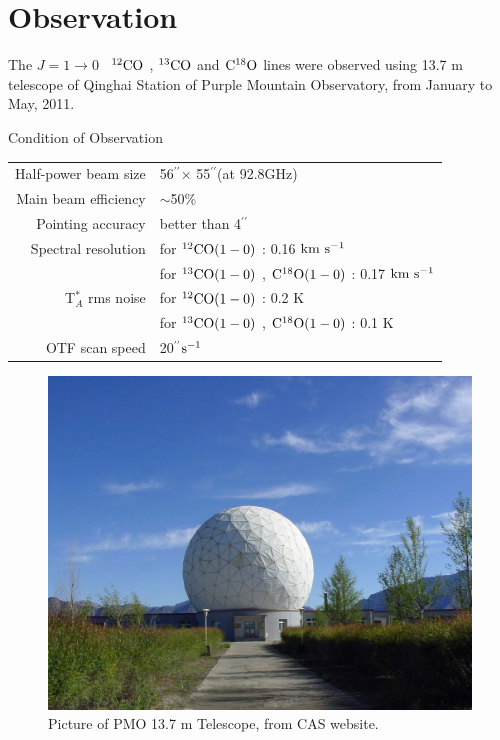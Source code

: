\documentclass{article}
\newcommand{\coa}{$\rm ^{12}CO$ }
\newcommand{\cob}{$\rm ^{13}CO$ }
\newcommand{\coc}{$\rm C^{18}O$ }
\newcommand{\coaa}{$\rm^{12}CO(1-0)$ }
\newcommand{\cobb}{$\rm^{13}CO(1-0)$ }
\newcommand{\cocc}{$\rm C^{18}O(1-0)$ }
\newcommand{\kms}{$\rm km\ s^{-1}$}
\newcommand{\arcsec}{$^{\prime\prime}$}
\begin{document}
\newpage
\section{Observation}

     The $J=1 \rightarrow 0 $ \  \coa, \cob and \coc lines were observed using 13.7 m telescope of Qinghai Station of Purple Mountain Observatory, from January to May, 2011.

        \begin{table}[H]
        \centering
         Condition of Observation\\
         \small
        \setlength{\tabcolsep}{0.1in}
        \begin{tabular}{rl}
        \\
        Half-power beam size & 56\arcsec$\times$ 55\arcsec (at 92.8GHz) \\
        Main beam efficiency & $\sim$50\%                               \\
        Pointing accuracy    & better than 4\arcsec                     \\
        Spectral resolution  & for \coaa: 0.16 \kms                     \\
                             & for \cobb, \cocc:  0.17 \kms           \\
        T$^*_A$ rms noise    & for \coaa: 0.2 K                         \\
                             & for \cobb, \cocc: 0.1 K               \\
        OTF scan speed       & 20\arcsec $\rm s^{-1}$


        \end{tabular}
        \end{table}

\newpage

    \begin{figure}[H]
              \centering
              \includegraphics[totalheight=75 mm]{pmo_picture.jpg}
              \caption{Picture of PMO 13.7 m Telescope, from CAS website.}
    \end{figure}
\end{document}
